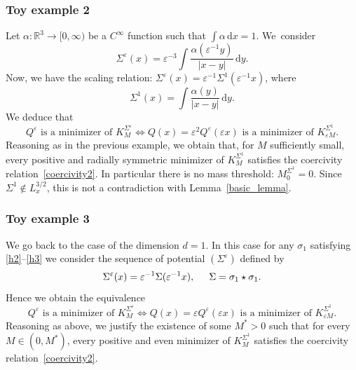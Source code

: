 \documentclass[10pt]{amsart}
\theoremstyle{definition}
\let\ds\displaystyle
\newcommand{\ud}{\, {\mathrm{d}}}
\begin{document}
\subsubsection*{Toy example 2}
Let $\alpha:\mathbb R^3\to [0,\infty)$ be a $C^\infty$ function such that $\int \alpha\ud x=1$. We~consider
\[
\Sigma^{\varepsilon}(x)=\varepsilon^{-3}\ds\int \ds\frac{\alpha(\varepsilon^{-1}y)}{|x-y|}\ud y.
\]
Now, we have the scaling relation: $\Sigma^{\varepsilon}(x)=\varepsilon^{-1}\Sigma^{1}(\varepsilon^{-1}x)$, where
\[
\Sigma^{1}(x)=\ds\int \ds\frac{\alpha(y)}{|x-y|}\ud y.
\]
We deduce that
\[
Q^{\varepsilon} \text{ is a minimizer of } K_{M}^{\Sigma^{\varepsilon}} \iff Q(x)=\varepsilon^{2}Q^{\varepsilon}(\varepsilon x) \text{ is a minimizer of } K_{\varepsilon M}^{\Sigma^{1}}.
\]
Reasoning as in the previous example, we obtain that, for $M$ sufficiently small, every positive and radially symmetric minimizer of $K_{M}^{\Sigma^{1}}$ satisfies the coercivity relation~\eqref{coercivity2}. In particular there is no mass threshold: $M_{0}^{\Sigma^{1}}=0$. Since $\Sigma^{1}\notin L_{x}^{3/2}$, this is not a contradiction with Lemma~\ref{basic_lemma}.

\subsubsection*{Toy example 3}
We go back to the case of the dimension $d=1$. In this case for any $\sigma_{1}$ satisfying \eqref{h2}--\eqref{h3} we consider the sequence of potential $(\Sigma^{\varepsilon})$ defined by
\[
\Sigma^{\varepsilon}(x)=\varepsilon^{-1}\Sigma(\varepsilon^{-1}x), \hspace{0.5cm} \Sigma=\sigma_{1}\star\sigma_{1}.
\]
Hence we obtain the equivalence
\[
Q^{\varepsilon} \text{ is a minimizer of } K_{M}^{\Sigma^{\varepsilon}} \iff Q(x)=\varepsilon Q^{\varepsilon}(\varepsilon x) \text{ is a minimizer of } K_{\varepsilon M}^{\Sigma^{1}}.
\]
Reasoning as above, we justify the existence of some $M^{*}>0$ such that for every $M\in(0,M^{*})$, every positive and even minimizer of $K_{M}^{\Sigma^{1}}$ satisfies the coercivity relation~\eqref{coercivity2}.
\end{document}
